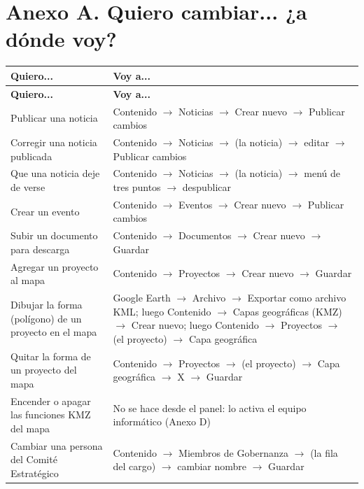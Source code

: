 \documentclass[11pt,letterpaper]{report}
\begin{document}
\section{Anexo A. Quiero cambiar... ¿a dónde voy?}
\begin{longtable}{>{\raggedright\arraybackslash}p{}>{\raggedright\arraybackslash}p{}}
\rowcolor{h2vazul}\textbf{\color{white}Quiero...} & \textbf{\color{white}Voy a...} \\
\endfirsthead
\rowcolor{h2vazul}\textbf{\color{white}Quiero...} & \textbf{\color{white}Voy a...} \\
\endhead
Publicar una noticia & Contenido $\rightarrow$ Noticias $\rightarrow$ Crear nuevo $\rightarrow$ Publicar cambios \\ \midrule
\rowcolor{filaalt}Corregir una noticia publicada & Contenido $\rightarrow$ Noticias $\rightarrow$ (la noticia) $\rightarrow$ editar $\rightarrow$ Publicar cambios \\ \midrule
Que una noticia deje de verse & Contenido $\rightarrow$ Noticias $\rightarrow$ (la noticia) $\rightarrow$ menú de tres puntos $\rightarrow$ despublicar \\ \midrule
\rowcolor{filaalt}Crear un evento & Contenido $\rightarrow$ Eventos $\rightarrow$ Crear nuevo $\rightarrow$ Publicar cambios \\ \midrule
Subir un documento para descarga & Contenido $\rightarrow$ Documentos $\rightarrow$ Crear nuevo $\rightarrow$ Guardar \\ \midrule
\rowcolor{filaalt}Agregar un proyecto al mapa & Contenido $\rightarrow$ Proyectos $\rightarrow$ Crear nuevo $\rightarrow$ Guardar \\ \midrule
Dibujar la forma (polígono) de un proyecto en el mapa & Google Earth $\rightarrow$ Archivo $\rightarrow$ Exportar como archivo KML; luego Contenido $\rightarrow$ Capas geográficas (KMZ) $\rightarrow$ Crear nuevo; luego Contenido $\rightarrow$ Proyectos $\rightarrow$ (el proyecto) $\rightarrow$ Capa geográfica \\ \midrule
\rowcolor{filaalt}Quitar la forma de un proyecto del mapa & Contenido $\rightarrow$ Proyectos $\rightarrow$ (el proyecto) $\rightarrow$ Capa geográfica $\rightarrow$ X $\rightarrow$ Guardar \\ \midrule
Encender o apagar las funciones KMZ del mapa & No se hace desde el panel: lo activa el equipo informático (Anexo D) \\ \midrule
\rowcolor{filaalt}Cambiar una persona del Comité Estratégico & Contenido $\rightarrow$ Miembros de Gobernanza $\rightarrow$ (la fila del cargo) $\rightarrow$ cambiar nombre $\rightarrow$ Guardar \\ \midrule

\end{longtable}
\end{document}
